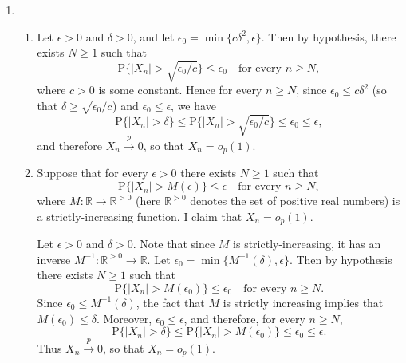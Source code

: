 \documentclass[12pt]{article}
\newcommand{\Prob}{\mathrm{P}}
\begin{document}
\begin{enumerate}
\item
\begin{enumerate}[label=(\roman*)]
\item
Let $\epsilon > 0$ and $\delta > 0$, and let $\epsilon_0 = \min\{c\delta^2, \epsilon\}$. Then by hypothesis, there exists $N \geq 1$ such that
\begin{equation*}
\Prob\{|X_n| > \sqrt{\epsilon_0 / c}\} \leq \epsilon_0 \quad \text{for every $n \geq N$},
\end{equation*}
where $c > 0$ is some constant. Hence for every $n \geq N$, since $\epsilon_0 \leq c\delta^2$ (so that $\delta \geq \sqrt{\epsilon_0 / c}$) and $\epsilon_0 \leq \epsilon$, we have
\begin{equation*}
\Prob\{|X_n| > \delta\} \leq \Prob\{|X_n| > \sqrt{\epsilon_0 / c}\} \leq \epsilon_0 \leq \epsilon,
\end{equation*}
and therefore $X_n \overset{p}\to 0$, so that $X_n = o_p(1)$.

\item
Suppose that for every $\epsilon > 0$ there exists $N \geq 1$ such that
\begin{equation*}
\Prob\{|X_n| > M(\epsilon)\} \leq \epsilon \quad \text{for every $n \geq N$},
\end{equation*}
where $M : \mathbb{R} \to \mathbb{R}^{>0}$ (here $\mathbb{R}^{>0}$ denotes the set of positive real numbers) is a strictly-increasing function. I claim that $X_n = o_p(1)$.

Let $\epsilon > 0$ and $\delta > 0$. Note that since $M$ is strictly-increasing, it has an inverse $M^{-1} : \mathbb{R}^{>0} \to \mathbb{R}$. Let $\epsilon_0 = \min\{M^{-1}(\delta), \epsilon\}$. Then by hypothesis there exists $N \geq 1$ such that
\begin{equation*}
\Prob\{|X_n| > M(\epsilon_0)\} \leq \epsilon_0 \quad \text{for every $n \geq N$}.
\end{equation*}
Since $\epsilon_0 \leq M^{-1}(\delta)$, the fact that $M$ is strictly increasing implies that $M(\epsilon_0) \leq \delta$. Moreover, $\epsilon_0 \leq \epsilon$, and therefore, for every $n \geq N$,
\begin{equation*}
\Prob\{|X_n| > \delta\} \leq \Prob\{|X_n| > M(\epsilon_0)\} \leq \epsilon_0 \leq \epsilon.
\end{equation*}
Thus $X_n \overset{p}\to 0$, so that $X_n = o_p(1)$.

\end{enumerate}


\end{enumerate}
\end{document}
